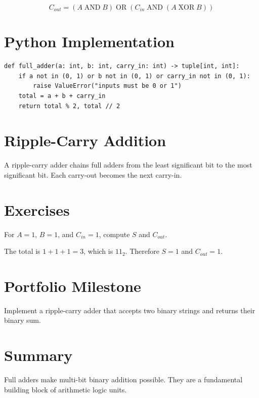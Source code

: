 \[
C_{out}=(A\operatorname{AND}B)\operatorname{OR}(C_{in}\operatorname{AND}(A\operatorname{XOR}B))
\]

\section{Python Implementation}

\begin{lstlisting}
def full_adder(a: int, b: int, carry_in: int) -> tuple[int, int]:
    if a not in (0, 1) or b not in (0, 1) or carry_in not in (0, 1):
        raise ValueError("inputs must be 0 or 1")
    total = a + b + carry_in
    return total % 2, total // 2
\end{lstlisting}

\section{Ripple-Carry Addition}

A ripple-carry adder chains full adders from the least significant bit to the most significant bit. Each carry-out becomes the next carry-in.

\section{Exercises}

\begin{exercise}
For \(A=1\), \(B=1\), and \(C_{in}=1\), compute \(S\) and \(C_{out}\).
\end{exercise}

\begin{solution}
The total is \(1+1+1=3\), which is \(11_2\). Therefore \(S=1\) and \(C_{out}=1\).
\end{solution}

\section{Portfolio Milestone}

Implement a ripple-carry adder that accepts two binary strings and returns their binary sum.

\section{Summary}

Full adders make multi-bit binary addition possible. They are a fundamental building block of arithmetic logic units.
